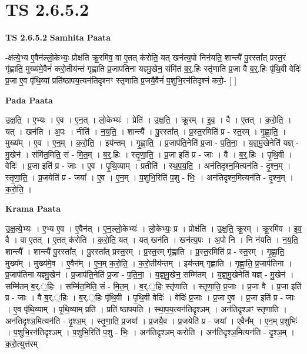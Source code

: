 \documentclass[17pt]{extarticle}
\begin{document}
\section{ TS 2.6.5.2 }

\textbf{TS 2.6.5.2 } \newline
\textbf{Samhita Paata} \newline

-क्ष॑त्ये॒भ्य ए॒वैन॑ल्लो॒केभ्यः॒ प्रोक्ष॑ति क्रू॒रमि॑व॒ वा ए॒तत् क॑रोति॒ यत् खन॑त्य॒पो निन॑यति॒ शान्त्यै॑ पु॒रस्ता᳚त् प्रस्त॒रं गृ॑ह्णाति॒ मुख्य॑मे॒वैनं॑ करो॒तीय॑न्तं गृह्णाति प्र॒जाप॑तिना यज्ञ्मु॒खेन॒ संमि॑तं ब॒र्॒.हिः स्तृ॑णाति प्र॒जा वै ब॒र्॒.हिः पृ॑थि॒वी वेदिः॑ प्र॒जा ए॒व पृ॑थि॒व्यां प्रति॑ष्ठापय॒त्यन॑तिदृश्नꣳ स्तृणाति प्र॒जयै॒वैनं॑ प॒शुभि॒रन॑तिदृश्नं करो॒- [  ] \newline

\textbf{Pada Paata} \newline

उ॒क्ष॒ति॒ । ए॒भ्यः । ए॒व । ए॒न॒त् । लो॒केभ्यः॑ । प्रेति॑ । उ॒क्ष॒ति॒ । क्रू॒रम् । इ॒व॒ । वै । ए॒तत् । क॒रो॒ति॒ । यत् । खन॑ति । अ॒पः । नीति॑ । न॒य॒ति॒ । शान्त्यै᳚ । पु॒रस्ता᳚त् । प्र॒स्त॒रमिति॑ प्र - स्त॒रम् । गृ॒ह्णा॒ति॒ । मुख्य᳚म् । ए॒व । ए॒न॒म् । क॒रो॒ति॒ । इय॑न्तम् । गृ॒ह्णा॒ति॒ । प्र॒जाप॑ति॒नेति॑ प्र॒जा - प॒ति॒ना॒ । य॒ज्ञ्॒मु॒खेनेति॑ यज्ञ् - मु॒खेन॑ । संमि॑त॒मिति॒ सं - मि॒त॒म् । ब॒र्॒.हिः । स्तृ॒णा॒ति॒ । प्र॒जा इति॑ प्र - जाः । वै । ब॒र्॒.हिः । पृ॒थि॒वी । वेदिः॑ । प्र॒जा इति॑ प्र - जाः । ए॒व । पृ॒थि॒व्याम् । प्रतीति॑ । स्थ॒प॒य॒ति॒ । अन॑तिदृश्न॒मित्यन॑ति - दृ॒श्न॒म् । स्तृ॒णा॒ति॒ । प्र॒जयेति॑ प्र - जया᳚ । ए॒व । ए॒न॒म् । प॒शुभि॒रिति॑ प॒शु - भिः॒ । अन॑तिदृश्न॒मित्यन॑ति - दृ॒श्न॒म् । क॒रो॒ति॒ ।  \newline


\textbf{Krama Paata} \newline

उ॒क्ष॒त्ये॒भ्यः । ए॒भ्य ए॒व । ए॒वैन॑त् । ए॒न॒ल्लो॒केभ्यः॑ । लो॒केभ्यः॒ प्र । प्रोक्ष॑ति । उ॒क्ष॒ति॒ क्रू॒रम् । क्रू॒रमि॑व । इ॒व॒ वै । वा ए॒तत् । ए॒तत् क॑रोति । क॒रो॒ति॒ यत् । यत् खन॑ति । खन॑त्य॒पः । अ॒पो नि । नि न॑यति । न॒य॒ति॒ शान्त्यै᳚ । शान्त्यै॑ पु॒रस्ता᳚त् । पु॒रस्ता᳚त् प्रस्त॒रम् । प्र॒स्त॒रम् गृ॑ह्णाति । प्र॒स्त॒रमिति॑ प्र - स्त॒रम् । गृ॒ह्णा॒ति॒ मुख्य᳚म् । मुख्य॑मे॒व । ए॒वैन᳚म् । ए॒न॒म् क॒रो॒ति॒ । क॒रो॒तीय॑न्तम् । इय॑न्तम् गृह्णाति । गृ॒ह्णा॒ति॒ प्र॒जाप॑तिना । प्र॒जाप॑तिना यज्ञ्मु॒खेन॑ । प्र॒जाप॑ति॒नेति॑ प्र॒जा - प॒ति॒ना॒ । य॒ज्ञ्॒मु॒खेन॒ सम्मि॑तम् । य॒ज्ञ्॒मु॒खेनेति॑ यज्ञ् - मु॒खेन॑ । सम्मि॑तम् ब॒र्.॒हिः । सम्मि॑त॒मिति॒ सं - मि॒त॒म् । ब॒र्.॒हिः स्तृ॑णाति । स्तृ॒णा॒ति॒ प्र॒जाः । प्र॒जा वै । प्र॒जा इति॑ प्र - जाः । वै ब॒र्.॒हिः । ब॒र्.॒हिः पृ॑थि॒वी । पृ॒थि॒वी वेदिः॑ । वेदिः॑ प्र॒जाः । प्र॒जा ए॒व । प्र॒जा इति॑ प्र - जाः । ए॒व पृ॑थि॒व्याम् । पृ॒थि॒व्याम् प्रति॑ । प्रति॑ ष्ठापयति । स्था॒प॒य॒त्यन॑तिदृश्ञम् । अन॑तिदृश्ञꣳ स्तृणाति । अन॑तिदृश्ञ॒मित्यन॑ति - दृ॒श्ञ॒म् । स्तृ॒णा॒ति॒ प्र॒जया᳚ । प्र॒जयै॒व । प्र॒जयेति॑ प्र - जया᳚ । ए॒वैन᳚म् । ए॒न॒म् प॒शुभिः॑ । प॒शुभि॒रन॑तिदृश्ञम् । प॒शुभि॒रिति॑ प॒शु - भिः॒ । अन॑तिदृश्ञम् करोति । अन॑तिदृश्ञ॒मित्यन॑ति - दृ॒श्ञ॒म् । क॒रो॒त्युत्त॑रम् \newline
\end{document}
